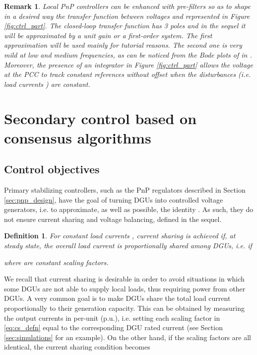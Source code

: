 \documentclass[a4paper]{article}
\theoremstyle{plain}
\newtheorem{rmk}{Remark}
\newtheorem{definition}{Definition}
\begin{document}
\begin{rmk}
	\label{rmk:integral}
	Local PnP controllers can be enhanced with pre-filters so as to shape
	in a desired way the transfer function  between voltages
	 and  represented in Figure
	\ref{fig:ctrl_part}. The closed-loop transfer function 
	has 3 poles and in the sequel it will be approximated by a unit gain
	or a first-order system. The first approximation will be used mainly
	for tutorial reasons. The second one is very mild at low and medium
	frequencies, as can be noticed from the Bode plots of
	 in
	\cite{tucci2015decentralized}. Moreover, the presence of an
	integrator in Figure \ref{fig:ctrl_part} allows the
	voltage  at the PCC to
	track constant references without offset when the
	disturbances (i.e. load currents ) are constant.
\end{rmk}

\section{Secondary control based on consensus algorithms}
\label{sec:consensus}
\subsection{Control objectives}
Primary stabilizing  controllers, such as the PnP regulators described in Section \ref{sec:pnp_design}, have the goal of turning DGUs into controlled voltage generators, i.e. to approximate, as well as possible, the identity . As such, they do not ensure current sharing and voltage balancing, defined in the sequel.
\begin{definition}
	\label{defn:cs}
	For constant load currents , \textit{current sharing} is achieved if, at steady state, the overall load current is
	proportionally shared among DGUs, i.e. if
	
	where  are constant scaling factors.
\end{definition}

We recall that current sharing is desirable in order to avoid
situations in which some DGUs are not able to supply local
loads, thus requiring power from other DGUs. A very common goal is to make DGUs share the total load
current proportionally to their generation capacity. This can be obtained by measuring the output currents
in per-unit (p.u.), i.e. setting each scaling factor  in \eqref{eq:cs_defn} equal to the corresponding DGU rated current (see Section \ref{sec:simulations} for an example).
On the other hand, if the scaling factors are all identical, the current sharing condition becomes
\end{document}
